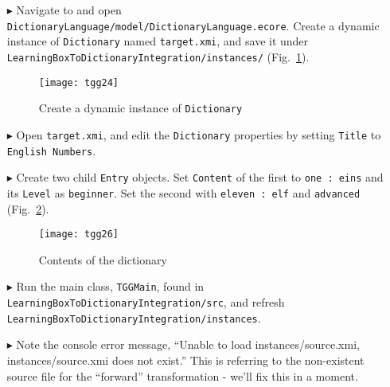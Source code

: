\begin{itemize}
\item[$\blacktriangleright$] Navigate to and open \texttt{Dictionary\-Language/model/Dictionary\-Language.ecore}. Create a dynamic instance of
\texttt{Dictionary} named \texttt{target.xmi}, and save it under \texttt{Learn\-ing\-Box\-To\-Dictionary\-In\-te\-gra\-tion/in\-stan\-ces/}
(Fig.~\ref{fig:create_instance_dict}).

\begin{figure}[htbp]
\begin{center}
  \texttt{[image: tgg24]}
  \caption{Create a dynamic instance of \texttt{Dictionary}}
  \label{fig:create_instance_dict}
\end{center}
\end{figure}

\item[$\blacktriangleright$] Open \texttt{target.xmi}, and edit the \texttt{Dictionary} properties by setting \texttt{Title} to \texttt{English Numbers}.

\item[$\blacktriangleright$] Create two child \texttt{Entry} objects. Set \texttt{Content} of the first to \texttt{one : eins} and its
\texttt{Level} as \texttt{beginner}. Set the second with \texttt{eleven : elf} and \texttt{advanced} (Fig.~\ref{fig:dictionaryxmi}).

\begin{figure}[htbp]
\begin{center}
  \texttt{[image: tgg26]}
  \caption{Contents of the dictionary}
  \label{fig:dictionaryxmi}
\end{center}
\end{figure}

\item[$\blacktriangleright$] Run the main class, \texttt{TGGMain}, found in \texttt{LearningBox\-To\-Dictionary\-In\-te\-gra\-tion\-/src}, and refresh
\texttt{LearningBox\-To\-Dictionary\-In\-te\-gra\-tion/\-instances}.

\vspace{0.5cm}

\item[$\blacktriangleright$] Note the console error message, ``Unable to load instances/source.xmi, instances/source.xmi does not exist.'' This is referring to
the non-existent source file for the ``forward'' transformation - we'll fix this in a moment.
\end{itemize}

